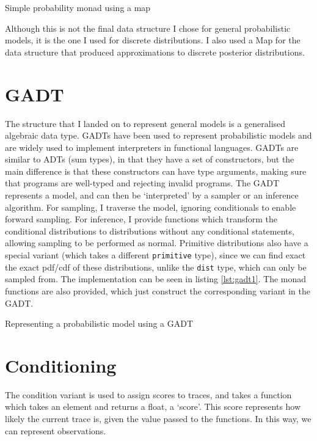 \begin{listing}[!ht]
	\caption{Simple probability monad using a map}
	\label{lst:monad_pmap}
\end{listing}

Although this is not the final data structure I chose for general probabilistic models, it is the one I used for discrete distributions. I also used a Map for the data structure that produced approximations to discrete posterior distributions.

\section{GADT}

The structure that I landed on to represent general models is a generalised algebraic data type. GADTs have been used to represent probabilistic models \cite{scibior2015practical} and are widely used to implement interpreters in functional languages. GADTs are similar to ADTs (sum types), in that they have a set of constructors, but the main difference is that these constructors can have type arguments, making sure that programs are well-typed and rejecting invalid programs. The GADT represents a model, and can then be `interpreted' by a sampler or an inference algorithm. For sampling, I traverse the model, ignoring conditionals to enable forward sampling. For inference, I provide functions which transform the conditional distributions to distributions without any conditional statements, allowing sampling to be performed as normal. Primitive distributions also have a special variant (which takes a different \texttt{primitive} type), since we can find exact the exact pdf/cdf of these distributions, unlike the \texttt{dist} type, which can only be sampled from. The implementation can be seen in listing \ref{lst:gadt1}. The monad functions are also provided, which just construct the corresponding variant in the GADT.


\begin{listing}[!ht]
	\caption{Representing a probabilistic model using a GADT}
	\label{lst:gadt1}
\end{listing}


\section{Conditioning}
The condition variant is used to assign scores to traces, and takes a function which takes an element and returns a float, a `score'. This score represents how likely the current trace is, given the value passed to the functions. In this way, we can represent observations. 

